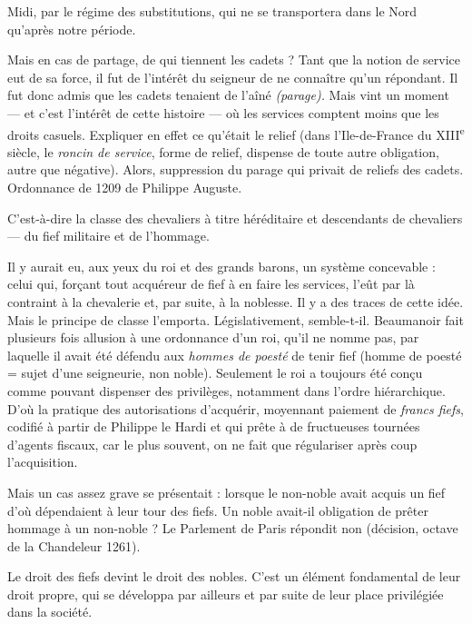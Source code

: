 \documentclass[french,twoside]{book} %
\newcommand{\labelchar}[1]{{\color{rubric}\bf #1}}
\begin{document}
\label{p67} Midi, par le régime des substitutions, qui ne se transportera dans le Nord qu’après notre période.\par
Mais en cas de partage, de qui tiennent les cadets ? Tant que la notion de service eut de sa force, il fut de l’intérêt du seigneur de ne connaître qu’un répondant. Il fut donc admis que les cadets tenaient de l’aîné {\itshape (parage).} Mais vint un moment — et c’est l’intérêt de cette histoire — où les services comptent moins que les droits casuels. Expliquer en effet ce qu’était le relief (dans l’Ile-de-France du XIII\textsuperscript{e} siècle, le \emph{roncin de service}, forme de relief, dispense de toute autre obligation, autre que négative). Alors, suppression du parage qui privait de reliefs des cadets. Ordonnance de 1209 de Philippe Auguste.\par
\bigbreak
\noindent \labelchar{f) Restriction à la classe noble}\par
C’est-à-dire la classe des chevaliers à titre héréditaire et descendants de chevaliers — du fief militaire et de l’hommage.\par
Il y aurait eu, aux yeux du roi et des grands barons, un système concevable : celui qui, forçant tout acquéreur de fief à en faire les services, l’eût par là contraint à la chevalerie et, par suite, à la noblesse. Il y a des traces de cette idée. Mais le principe de classe l’emporta. Législativement, semble-t-il. Beaumanoir fait plusieurs fois allusion à une ordonnance d’un roi, qu’il ne nomme pas, par laquelle il avait été défendu aux \emph{hommes de poesté} de tenir fief (homme de poesté = sujet d’une seigneurie, non noble). Seulement le roi a toujours été conçu comme pouvant dispenser des privilèges, notamment dans l’ordre hiérarchique. D’où la pratique des autorisations d’acquérir, moyennant paiement de \emph{francs fiefs}, codifié à partir de Philippe le Hardi et qui prête à de fructueuses tournées d’agents fiscaux, car le plus souvent, on ne fait que régulariser après coup l’acquisition.\par
Mais un cas assez grave se présentait : lorsque le non-noble avait acquis un fief d’où dépendaient à leur tour des fiefs. Un noble avait-il obligation de prêter hommage à un non-noble ? Le Parlement de Paris répondit non (décision, octave de la Chandeleur 1261).\par
Le droit des fiefs devint le droit des nobles. C’est un élément fondamental de leur droit propre, qui se développa par ailleurs et par suite de leur place privilégiée dans la société.
\end{document}
